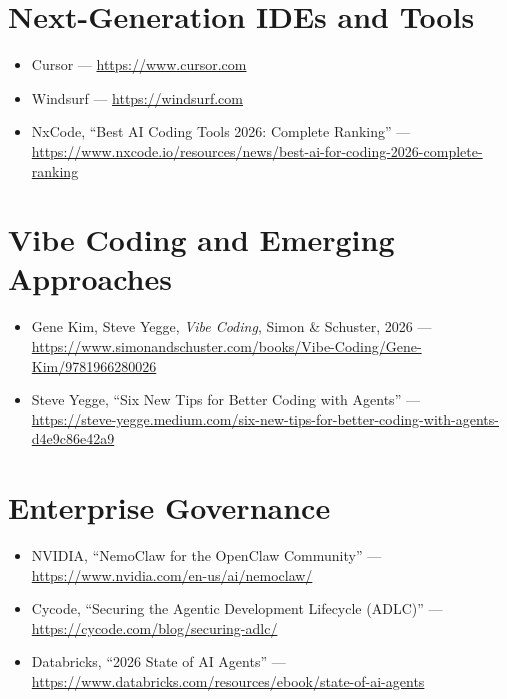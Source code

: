 \section{Next-Generation IDEs and Tools}

\begin{itemize}
  \item Cursor --- \url{https://www.cursor.com}
  \item Windsurf --- \url{https://windsurf.com}
  \item NxCode, ``Best AI Coding Tools 2026: Complete Ranking'' --- \\
    \url{https://www.nxcode.io/resources/news/best-ai-for-coding-2026-complete-ranking}
\end{itemize}

\section{Vibe Coding and Emerging Approaches}

\begin{itemize}
  \item Gene Kim, Steve Yegge, \textit{Vibe Coding}, Simon \& Schuster, 2026 --- \\
    \url{https://www.simonandschuster.com/books/Vibe-Coding/Gene-Kim/9781966280026}
  \item Steve Yegge, ``Six New Tips for Better Coding with Agents'' --- \\
    \url{https://steve-yegge.medium.com/six-new-tips-for-better-coding-with-agents-d4e9c86e42a9}
\end{itemize}

\section{Enterprise Governance}

\begin{itemize}
  \item NVIDIA, ``NemoClaw for the OpenClaw Community'' --- \\
    \url{https://www.nvidia.com/en-us/ai/nemoclaw/}
  \item Cycode, ``Securing the Agentic Development Lifecycle (ADLC)'' --- \\
    \url{https://cycode.com/blog/securing-adlc/}
  \item Databricks, ``2026 State of AI Agents'' --- \\
    \url{https://www.databricks.com/resources/ebook/state-of-ai-agents}
\end{itemize}

